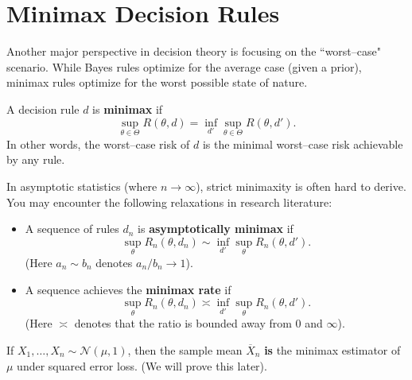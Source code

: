 \section{Minimax Decision Rules}
\label{sec:minimax_rules}

Another major perspective in decision theory is focusing on the ``worst--case" scenario. While Bayes rules optimize for the average case (given a prior), minimax rules optimize for the worst possible state of nature.

\begin{definition}
\label{def:minimax}
A decision rule \(d\) is \textbf{minimax} if
\[
\sup_{\theta \in \Theta} R(\theta, d) = \inf_{d'} \sup_{\theta \in \Theta} R(\theta, d').
\]
In other words, the worst--case risk of \(d\) is the minimal worst--case risk achievable by any rule.
\end{definition}

\begin{remark}
    In asymptotic statistics (where \(n \to \infty\)), strict minimaxity is often hard to derive. You may encounter the following relaxations in research literature:
    \begin{itemize}
        \item A sequence of rules \(d_n\) is \textbf{asymptotically minimax} if
        \[ \sup_{\theta} R_n(\theta, d_n) \sim \inf_{d'} \sup_{\theta} R_n(\theta, d'). \]
        (Here \(a_n \sim b_n\) denotes \(a_n/b_n \to 1\)).
        \item A sequence achieves the \textbf{minimax rate} if
        \[ \sup_{\theta} R_n(\theta, d_n) \asymp \inf_{d'} \sup_{\theta} R_n(\theta, d'). \]
        (Here \(\asymp\) denotes that the ratio is bounded away from 0 and \(\infty\)).
    \end{itemize}
\end{remark}


\begin{ex}
    If \(X_1, \dots, X_n \sim \mathcal{N}(\mu, 1)\), then the sample mean \(\overline{X}_n\) \textbf{is} the minimax estimator of \(\mu\) under squared error loss. (We will prove this later).
\end{ex}



